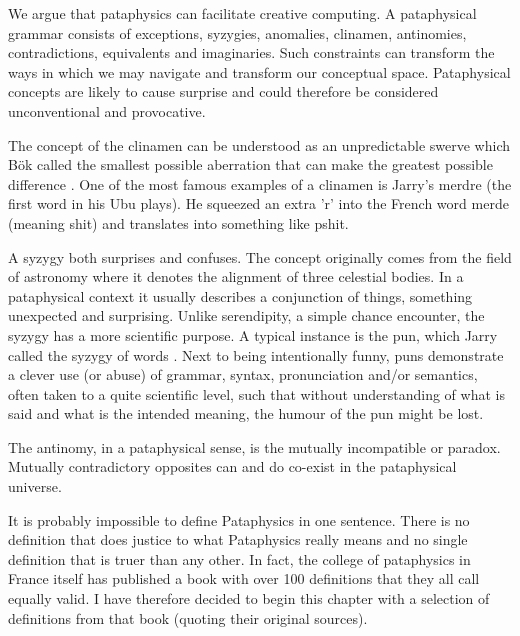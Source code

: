 \begin{draft}
  We argue that pataphysics can facilitate creative computing. A pataphysical grammar consists of exceptions, syzygies, anomalies, clinamen, antinomies, contradictions, equivalents and imaginaries. Such constraints can transform the ways in which we may navigate and transform our conceptual space. Pataphysical concepts are likely to cause surprise and could therefore be considered unconventional and provocative.

  The concept of the clinamen can be understood as an unpredictable swerve which Bök called the smallest possible aberration that can make the greatest possible difference \citep{Bok2002}. One of the most famous examples of a clinamen is Jarry's merdre (the first word in his Ubu plays). He squeezed an extra 'r' into the French word merde (meaning shit) and translates into something like pshit.

  A syzygy both surprises and confuses. The concept originally comes from the field of astronomy where it denotes the alignment of three celestial bodies. In a pataphysical context it usually describes a conjunction of things, something unexpected and surprising. Unlike serendipity, a simple chance encounter, the syzygy has a more scientific purpose. A typical instance is the pun, which Jarry called the syzygy of words \citep{Jarry1996}. Next to being intentionally funny, puns demonstrate a clever use (or abuse) of grammar, syntax, pronunciation and/or semantics, often taken to a quite scientific level, such that without understanding of what is said and what is the intended meaning, the humour of the pun might be lost.

  The antinomy, in a pataphysical sense, is the mutually incompatible or paradox. Mutually contradictory opposites can and do co-exist in the pataphysical universe.
\end{draft}

It is probably impossible to define Pataphysics in one sentence. There is no definition that does justice to what Pataphysics really means and no single definition that is truer than any other. In fact, the college of pataphysics in France itself has published a book \citep{Brotchie2003} with over 100 definitions that they all call equally valid.  I have therefore decided to begin this chapter with a selection of definitions from that book (quoting their original sources).

